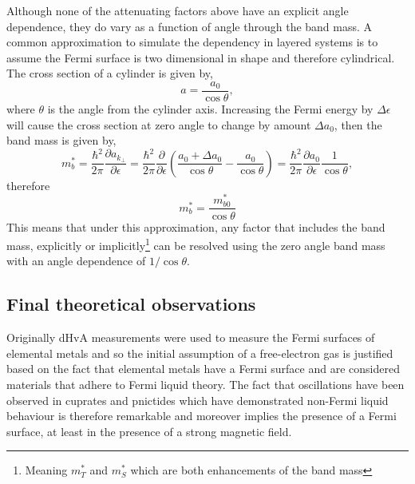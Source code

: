 Although none of the attenuating factors above have an explicit angle dependence, they do vary as a function of angle through the band mass. A common approximation to simulate the dependency in layered systems is to assume the Fermi surface is two dimensional in shape and therefore cylindrical. The cross section of a cylinder is given by,
\begin{equation}
    a = \frac{a_0}{\cos \theta},
\end{equation}
where $\theta$ is the angle from the cylinder axis. Increasing the Fermi energy by $\Delta \epsilon$ will cause the cross section at zero angle to change by amount $\Delta a_0$, then the band mass is given by,
\begin{equation}
    m^*_b = \frac{\hbar^2}{2\pi}\frac{\partial a_{k_\perp}}{\partial \epsilon} = \frac{\hbar^2}{2\pi}\frac{\partial}{\partial \epsilon}\left(\frac{a_0 + \Delta a_0 }{\cos\theta} - \frac{a_0 }{\cos\theta}\right) = \frac{\hbar^2}{2\pi}\frac{\partial a_0}{\partial \epsilon}\frac{1}{\cos \theta},
\end{equation}
therefore
\begin{equation}
    m^*_b = \frac{m^*_{b0} }{\cos{\theta}}
\end{equation}
This means that under this approximation, any factor that includes the band mass, explicitly or implicitly\footnote{Meaning $m^*_T$ and $m^*_S$ which are both enhancements of the band mass} can be resolved using the zero angle band mass with an angle dependence of $1/\cos{\theta}$.

\subsection{Final theoretical observations}

Originally \ac{dHvA} measurements were used to measure the Fermi surfaces of elemental metals and so the initial assumption of a free-electron gas is justified based on the fact that elemental metals have a Fermi surface and are considered materials that adhere to Fermi liquid theory. The fact that oscillations have been observed in cuprates and pnictides which have demonstrated non-Fermi liquid behaviour is therefore remarkable and moreover implies the presence of a Fermi surface, at least in the presence of a strong magnetic field.

